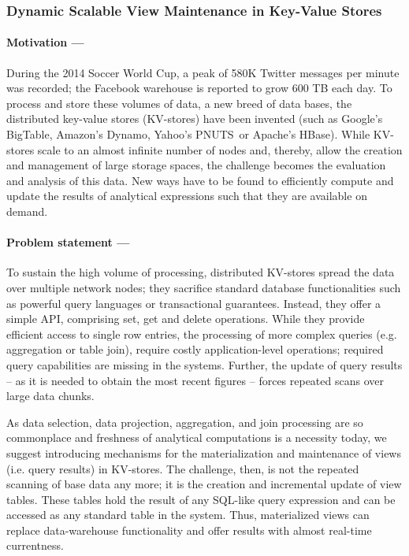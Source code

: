 
  
  
  \subsubsection{Dynamic Scalable View Maintenance in Key-Value Stores}
  
  \paragraph{Motivation ---}
 	During the 2014 Soccer World Cup, a peak of 580K Twitter messages per 
	minute was recorded; the Facebook warehouse is reported to grow 600 TB 
	each day. To process and store these volumes of data, a new breed of 
	data bases, the distributed key-value stores (KV-stores) have been invented 
	(such as Google's BigTable, Amazon's Dynamo, Yahoo's PNUTS\ or Apache's 
	HBase). While KV-stores scale to an almost infinite number of nodes and, 
	thereby, allow the creation and management of large storage spaces, the 
	challenge becomes the evaluation and analysis of this data. New ways 
	have to be found to efficiently compute and update the results of analytical 
	expressions such that they are available on demand. 



   \paragraph{Problem statement ---}
 	To sustain the high volume of processing, distributed KV-stores spread
 	the data over multiple network nodes; they sacrifice standard database 
 	functionalities such as powerful query languages or transactional guarantees. 
 	Instead, they offer a simple API, comprising set, get and delete operations. 
 	While they provide efficient access to single row entries, the processing 
 	of more	complex queries (e.g. aggregation or table join), require costly 
	application-level operations; required query capabilities are 
	missing in the systems. Further, the update of query results -- as it is 
	needed to obtain the most recent figures -- forces repeated scans over large 
	data chunks.
	
	As data selection, data projection, aggregation, and join processing are so 
	commonplace and freshness of analytical computations is a necessity today, we
	suggest introducing mechanisms for the materialization and maintenance 
	of views (i.e. query results) in KV-stores. The challenge, then, is not
	the repeated scanning of base data any more; it is the creation and 
	incremental update of view tables. These tables hold the result of any 
	SQL-like query expression and can be accessed as any standard table in
	the system. Thus, materialized views can replace data-warehouse 
	functionality and offer results with almost real-time currentness.  
	
